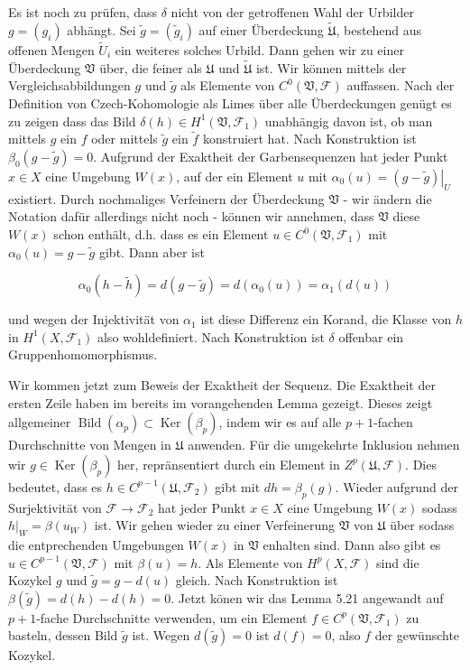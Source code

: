 \documentclass[10pt, letterpaper]{article}
\begin{document}
Es ist noch zu prüfen, dass $\delta$ nicht von der getroffenen Wahl der Urbilder $g=\left(g_{i}\right)$ abhängt. Sei $\widetilde{g}=\left(\widetilde{g}_{i}\right)$ auf einer Überdeckung $\widetilde{\mathfrak{U}}$, bestehend aus offenen Mengen $\widetilde{U}_{i}$ ein weiteres solches Urbild. Dann gehen wir zu einer Überdeckung $\mathfrak{V}$ über, die feiner als $\mathfrak{U}$ und $\tilde{\mathfrak{U}}$ ist. Wir können mittels der Vergleichsabbildungen $g$ und $\widetilde{g}$ als Elemente von $C^{0}(\mathfrak{V}, \mathcal{F})$ auffassen. Nach der Definition von Czech-Kohomologie als Limes über alle Überdeckungen genügt es zu zeigen dass das Bild $\delta(h) \in H^{1}\left(\mathfrak{V}, \mathcal{F}_{1}\right)$ unabhängig davon ist, ob man mittels $g$ ein $f$ oder mittels $\widetilde{g}$ ein $\widetilde{f}$ konstruiert hat. Nach Konstruktion ist $\beta_{0}(g-\widetilde{g})=0$. Aufgrund der Exaktheit der Garbensequenzen hat jeder Punkt $x \in X$ eine Umgebung $W(x)$, auf der ein Element $u$ mit $\alpha_{0}(u)=\left.(g-\widetilde{g})\right|_{U}$ existiert. Durch nochmaliges Verfeinern der Überdeckung $\mathfrak{V}$ - wir ändern die Notation dafür allerdings nicht noch - können wir annehmen, dass $\mathfrak{V}$ diese $W(x)$ schon enthält, d.h. dass es ein Element $u \in C^{0}\left(\mathfrak{V}, \mathcal{F}_{1}\right)$ mit $\alpha_{0}(u)=g-\widetilde{g}$ gibt. Dann aber ist

$$
\alpha_{0}(h-\widetilde{h})=d(g-\widetilde{g})=d\left(\alpha_{0}(u)\right)=\alpha_{1}(d(u))
$$

und wegen der Injektivität von $\alpha_{1}$ ist diese Differenz ein Korand, die Klasse von $h$ in $H^{1}\left(X, \mathcal{F}_{1}\right)$ also wohldefiniert. Nach Konstruktion ist $\delta$ offenbar ein Gruppenhomomorphismus.

Wir kommen jetzt zum Beweis der Exaktheit der Sequenz. Die Exaktheit der ersten Zeile haben im bereits im vorangehenden Lemma gezeigt. Dieses zeigt allgemeiner $\operatorname{Bild}\left(\alpha_{p}\right) \subset \operatorname{Ker}\left(\beta_{p}\right)$, indem wir es auf alle $p+1$-fachen Durchschnitte von Mengen in $\mathfrak{U}$ anwenden. Für die umgekehrte Inklusion nehmen wir $g \in \operatorname{Ker}\left(\beta_{p}\right)$ her, repränsentiert durch ein Element in $Z^{p}(\mathfrak{U}, \mathcal{F})$. Dies bedeutet, dass es $h \in C^{p-1}\left(\mathfrak{U}, \mathcal{F}_{2}\right)$ gibt mit $d h=\beta_{p}(g)$. Wieder aufgrund der Surjektivität von $\mathcal{F} \rightarrow \mathcal{F}_{2}$ hat jeder Punkt $x \in X$ eine Umgebung $W(x)$ sodass $\left.h\right|_{W}=\beta\left(u_{W}\right)$ ist. Wir gehen wieder zu einer Verfeinerung $\mathfrak{V}$ von $\mathfrak{U}$ über sodass die entprechenden Umgebungen $W(x)$ in $\mathfrak{V}$ enhalten sind. Dann also gibt es $u \in C^{p-1}(\mathfrak{V}, \mathcal{F})$ mit $\beta(u)=h$. Als Elemente von $H^{p}(X, \mathcal{F})$ sind die Kozykel $g$ und $\widetilde{g}=g-d(u)$ gleich. Nach Konstruktion ist $\beta(\widetilde{g})=d(h)-d(h)=0$. Jetzt könen wir das Lemma 5.21 angewandt auf $p+1$-fache Durchschnitte verwenden, um ein Element $f \in C^{p}\left(\mathfrak{V}, \mathcal{F}_{1}\right)$ zu basteln, dessen Bild $\widetilde{g}$ ist. Wegen $d(\widetilde{g})=0$ ist $d(f)=0$, also $f$ der gewünschte Kozykel.
\end{document}
